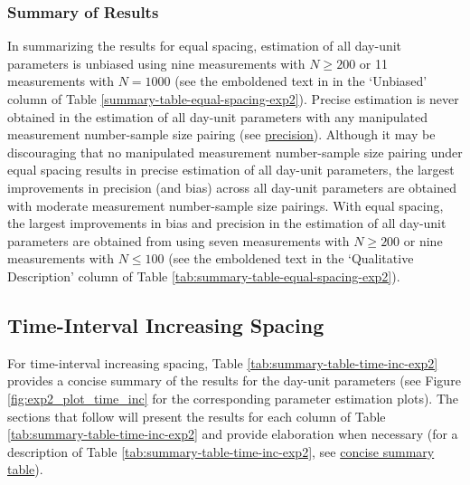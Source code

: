 \documentclass[
12pt, %
twoside,
english]{guelphthesis}
\theoremstyle{definition}
\theoremstyle{definition}
\theoremstyle{definition}
\theoremstyle{definition}
\theoremstyle{remark}
\begin{document}
\hypertarget{summary-of-results-4}{%
\subsubsection{Summary of Results}\label{summary-of-results-4}}

In summarizing the results for equal spacing, estimation of all day-unit parameters is unbiased using nine measurements with \(N \ge 200\) or 11 measurements with \(N = 1000\) (see the emboldened text in in the `Unbiased' column of Table \ref{summary-table-equal-spacing-exp2}). Precise estimation is never obtained in the estimation of all day-unit parameters with any manipulated measurement number-sample size pairing (see \protect\hyperlink{precision-time-inc-exp2}{precision}). Although it may be discouraging that no manipulated measurement number-sample size pairing under equal spacing results in precise estimation of all day-unit parameters, the largest improvements in precision (and bias) across all day-unit parameters are obtained with moderate measurement number-sample size pairings. With equal spacing, the largest improvements in bias and precision in the estimation of all day-unit parameters are obtained from using seven measurements with \(N \ge 200\) or nine measurements with \(N \le 100\) (see the emboldened text in the `Qualitative Description' column of Table \ref{tab:summary-table-equal-spacing-exp2}).

\hypertarget{time-interval-increasing-spacing-1}{%
\subsection{Time-Interval Increasing Spacing}\label{time-interval-increasing-spacing-1}}

For time-interval increasing spacing, Table \ref{tab:summary-table-time-inc-exp2} provides a concise summary of the results for the day-unit parameters (see Figure \ref{fig:exp2_plot_time_inc} for the corresponding parameter estimation plots). The sections that follow will present the results for each column of Table \ref{tab:summary-table-time-inc-exp2} and provide elaboration when necessary (for a description of Table \ref{tab:summary-table-time-inc-exp2}, see \protect\hyperlink{concise-example}{concise summary table}).
\end{document}
